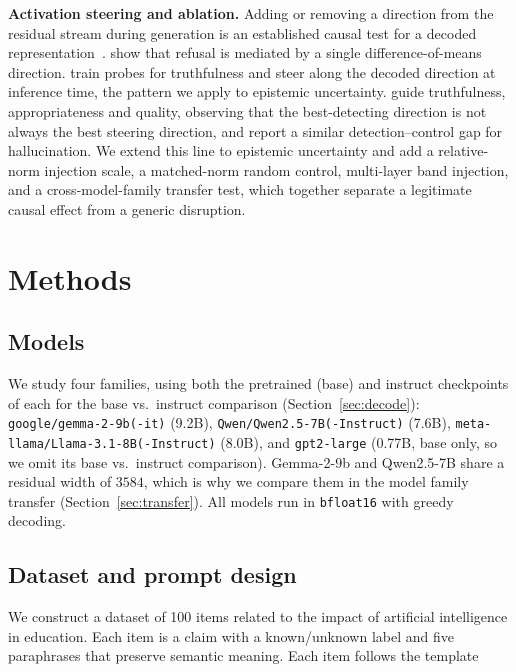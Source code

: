 \documentclass{article}
\begin{document}
\textbf{Activation steering and ablation.} Adding or removing a direction from the residual stream during generation is an established causal test for a decoded representation~\citep{turner2023activation, panickssery2023caa, zou2023representation}. \citet{arditi2024refusal} show that refusal is mediated by a single difference-of-means direction. \citet{li2023iti} train probes for truthfulness and steer along the decoded direction at inference time, the pattern we apply to epistemic uncertainty. \citet{vonrutte2024guide} guide truthfulness, appropriateness and quality, observing that the best-detecting direction is not always the best steering direction, and \citet{galeone2026perfect} report a similar detection--control gap for hallucination. We extend this line to epistemic uncertainty and add a relative-norm injection scale, a matched-norm random control, multi-layer band injection, and a cross-model-family transfer test, which together separate a legitimate causal effect from a generic disruption.

\section{Methods}

\subsection{Models}

We study four families, using both the pretrained (base) and instruct checkpoints of each for the base vs.\ instruct comparison (Section~\ref{sec:decode}): \texttt{google/gemma-2-9b(-it)} (9.2B), \texttt{Qwen/Qwen2.5-7B(-Instruct)} (7.6B), \texttt{meta-llama/Llama-3.1-8B(-Instruct)} (8.0B), and \texttt{gpt2-large} (0.77B, base only, so we omit its base vs.\ instruct comparison). Gemma-2-9b and Qwen2.5-7B share a residual width of $3584$, which is why we compare them in the model family transfer (Section~\ref{sec:transfer}). All models run in \texttt{bfloat16} with greedy decoding.

\subsection{Dataset and prompt design}

We construct a dataset of 100 items related to the impact of artificial intelligence in education. Each item is a claim with a known/unknown label and five paraphrases that preserve semantic meaning. Each item follows the template
\end{document}
